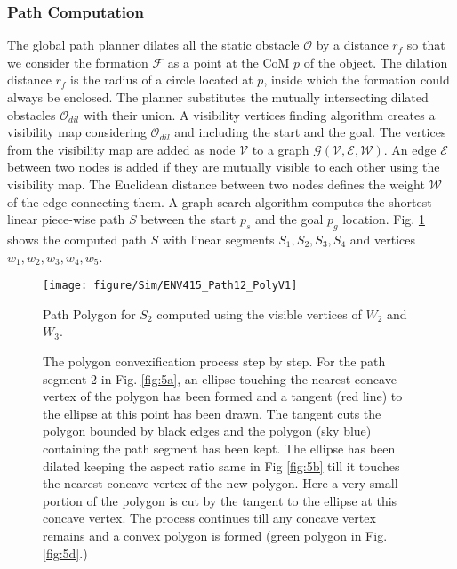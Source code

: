 \subsubsection{Path Computation} The global path planner dilates all the static obstacle $\mathcal{O}$ by a distance $r_f$ so that we consider the formation $\mathcal{F}$ as a point at the CoM $p$ of the object. The dilation distance $r_f$ is the radius of a circle located at $p$, inside which the formation could always be enclosed. The planner substitutes the mutually intersecting dilated obstacles $\mathcal{O}_{dil}$ with their union. A visibility vertices finding algorithm \cite{2005_Choset} creates a visibility map considering $\mathcal{O}_{dil}$ and including the start and the goal. The vertices from the visibility map are added as node $\mathcal{V}$ to a graph $\mathcal{G}(\mathcal{V}, \mathcal{E}, \mathcal{W})$. An edge $\mathcal{E}$ between two nodes is added if they are mutually visible to each other using the visibility map. The Euclidean distance between two nodes defines the weight $\mathcal{W}$ of the edge connecting them. A graph search algorithm computes the shortest linear piece-wise path $S$ between the start $p_s$ and the goal $p_g$ location. Fig. \ref{fig:4} shows the computed path $S$ with linear segments $S_1, S_2, S_3, S_4$ and vertices $w_1, w_2, w_3, w_4, w_5$.

\begin{figure}[H]
	\centerline{\texttt{[image: figure/Sim/ENV415\_Path12\_PolyV1]}}
	\caption{Path Polygon for $S_2$ computed using the visible vertices of $W_2$ and $W_3$.}
	\label{fig:4}
\end{figure}


\begin{figure*}[htbp]
	\centering
	\caption{The polygon convexification process step by step. For the path segment 2 in Fig. \ref{fig:5a}, an ellipse touching the nearest concave vertex of the polygon has been formed and a tangent (red line) to the ellipse at this point has been drawn. The tangent cuts the polygon bounded by black edges and the polygon (sky blue) containing the path segment has been kept. The ellipse has been dilated keeping the aspect ratio same in Fig \ref{fig:5b} till it touches the nearest concave vertex of the new polygon. Here a very small portion of the polygon is cut by the tangent to the ellipse at this concave vertex. The process continues till any concave vertex remains and a convex polygon is formed (green polygon in Fig. \ref{fig:5d}.)}
	\label{fig:5}
\end{figure*}

